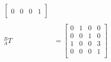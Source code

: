 \documentclass[12pt,letterpaper]{article}
\begin{document}
$$\begin{aligned}
\begin{bmatrix}
            \\
            0 & 0 & 0 & 1
            \\
        \end{bmatrix}
        \\
        \\
        _{A}^{B}T & =
        \begin{bmatrix}
            0 & 1 & 0 & 0
            \\
            0 & 0 & 1 & 0
            \\
            1 & 0 & 0 & 3
            \\
            0 & 0 & 0 & 1
            \\
        \end{bmatrix}
    \end{aligned}
$$
\end{document}
